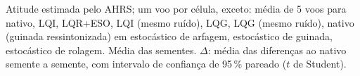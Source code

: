 Atitude estimada pelo AHRS; um voo por célula, exceto: média de 5 voos para nativo, LQI, LQR+ESO, LQI (mesmo ruído), LQG, LQG (mesmo ruído), nativo (guinada ressintonizada) em estocástico de arfagem, estocástico de guinada, estocástico de rolagem. Média das sementes. $\Delta$: média das diferenças ao nativo semente a semente, com intervalo de confiança de 95\,\% pareado ($t$ de Student).
